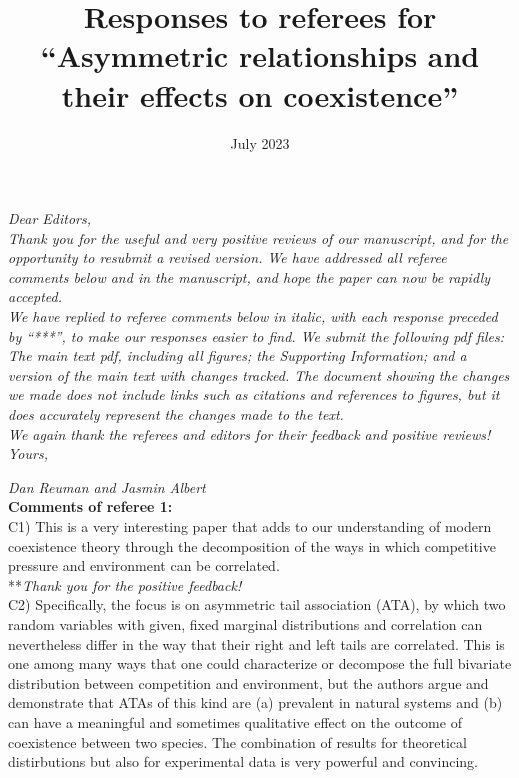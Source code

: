 \documentclass[letterpaper,11pt]{article}
\title{Responses to referees for ``Asymmetric relationships and their effects on coexistence''}
\date{July 2023}
\begin{document}
\noindent \emph{Dear Editors,} \\

\noindent \emph{Thank you for the useful and very positive reviews of our manuscript, and for
the opportunity to resubmit a revised version. We have addressed all referee comments below and in
the manuscript, and hope the paper can now be rapidly accepted. } \\

\noindent \emph{We have replied to referee comments below in italic, with each response preceded
by ``***'', to make our responses easier to find. We submit the following pdf files: The main text pdf, including all figures; 
the Supporting Information; and a version of the main text with changes tracked. The document showing 
the changes we made does not include links such as citations and
references to figures, but it does accurately represent the changes made to the text.} \\

\noindent \emph{We again thank the referees and editors for their feedback and positive reviews!} \\

\noindent \emph{Yours,}

\noindent \emph{Dan Reuman and Jasmin Albert} \\

\noindent \textbf{Comments of referee 1:} \\

\noindent C1) This is a very interesting paper that adds to our understanding of modern coexistence theory through the decomposition of the ways in which competitive pressure and environment can be correlated.\\

\noindent ***\emph{Thank you for the positive feedback!} \\

\noindent C2) Specifically, the focus is on asymmetric tail association (ATA), by which two random variables with given, fixed marginal distributions and correlation can nevertheless differ in the way that their right and left tails are correlated. This is one among many ways that one could characterize or decompose the full bivariate distribution between competition and environment, but the authors argue and demonstrate that ATAs of this kind are (a) prevalent in natural systems and (b) can have a meaningful and sometimes qualitative effect on the outcome of coexistence between two species.  The combination of results for theoretical distirbutions but also for experimental data is very powerful and convincing. \\
\end{document}
